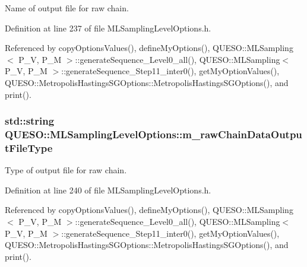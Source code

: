 Name of output file for raw chain. 



Definition at line 237 of file M\-L\-Sampling\-Level\-Options.\-h.



Referenced by copy\-Options\-Values(), define\-My\-Options(), Q\-U\-E\-S\-O\-::\-M\-L\-Sampling$<$ P\-\_\-\-V, P\-\_\-\-M $>$\-::generate\-Sequence\-\_\-\-Level0\-\_\-all(), Q\-U\-E\-S\-O\-::\-M\-L\-Sampling$<$ P\-\_\-\-V, P\-\_\-\-M $>$\-::generate\-Sequence\-\_\-\-Step11\-\_\-inter0(), get\-My\-Option\-Values(), Q\-U\-E\-S\-O\-::\-Metropolis\-Hastings\-S\-G\-Options\-::\-Metropolis\-Hastings\-S\-G\-Options(), and print().

\hypertarget{class_q_u_e_s_o_1_1_m_l_sampling_level_options_a239091edd94cfa694c6c33591c1d1ba2}{
\subsubsection[{m\-\_\-raw\-Chain\-Data\-Output\-File\-Type}]{\setlength{\rightskip}{0pt plus 5cm}std\-::string Q\-U\-E\-S\-O\-::\-M\-L\-Sampling\-Level\-Options\-::m\-\_\-raw\-Chain\-Data\-Output\-File\-Type}}\label{class_q_u_e_s_o_1_1_m_l_sampling_level_options_a239091edd94cfa694c6c33591c1d1ba2}


Type of output file for raw chain. 



Definition at line 240 of file M\-L\-Sampling\-Level\-Options.\-h.



Referenced by copy\-Options\-Values(), define\-My\-Options(), Q\-U\-E\-S\-O\-::\-M\-L\-Sampling$<$ P\-\_\-\-V, P\-\_\-\-M $>$\-::generate\-Sequence\-\_\-\-Level0\-\_\-all(), Q\-U\-E\-S\-O\-::\-M\-L\-Sampling$<$ P\-\_\-\-V, P\-\_\-\-M $>$\-::generate\-Sequence\-\_\-\-Step11\-\_\-inter0(), get\-My\-Option\-Values(), Q\-U\-E\-S\-O\-::\-Metropolis\-Hastings\-S\-G\-Options\-::\-Metropolis\-Hastings\-S\-G\-Options(), and print().

